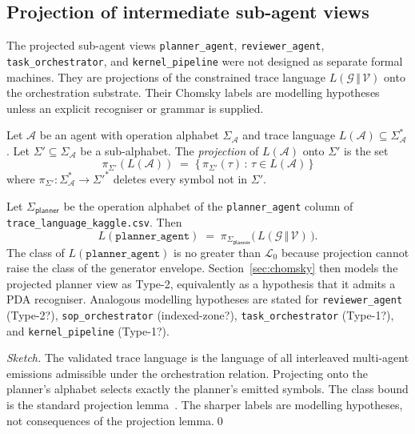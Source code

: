 \subsection{Projection of intermediate sub-agent views}

The projected sub-agent views \texttt{planner\_agent},
\texttt{reviewer\_agent}, \texttt{task\_orchestrator}, and
\texttt{kernel\_pipeline} were not designed as separate formal
machines.  They are projections of the constrained trace language
$L(\mathcal{G}\,\Vert\,\mathcal{V})$ onto the orchestration
substrate.  Their Chomsky labels are modelling hypotheses unless an
explicit recogniser or grammar is supplied.

\begin{definition}
\label{def:projection}
Let $\mathcal{A}$ be an agent with operation alphabet
$\Sigma_\mathcal{A}$ and trace language $L(\mathcal{A})\subseteq
\Sigma_\mathcal{A}^*$.  Let $\Sigma' \subseteq
\Sigma_\mathcal{A}$ be a sub-alphabet.  The \emph{projection}
of $L(\mathcal{A})$ onto $\Sigma'$ is the set
\[
\pi_{\Sigma'}(L(\mathcal{A})) \;=\;
\{\,\pi_{\Sigma'}(\tau) \,:\, \tau\in L(\mathcal{A})\,\}
\]
where $\pi_{\Sigma'}: \Sigma_\mathcal{A}^*\to{\Sigma'}^*$
deletes every symbol not in $\Sigma'$.
\end{definition}

\begin{theorem}
\label{thm:derived}
Let $\Sigma_{\textsf{planner}}$ be the operation alphabet of the
\texttt{planner\_agent} column of
\texttt{trace\_language\_kaggle.csv}.  Then
\[
L(\texttt{planner\_agent}) \;=\;
\pi_{\Sigma_{\textsf{planner}}}\bigl(\,L(\mathcal{G}\,\Vert\,\mathcal{V})\,
\bigr).
\]
The class of $L(\texttt{planner\_agent})$ is no greater than
$\mathcal{L}_0$ because projection cannot raise the class of the
generator envelope.  Section~\ref{sec:chomsky} then models the
projected planner view as Type-2, equivalently as a hypothesis that
it admits a PDA recogniser.  Analogous modelling hypotheses are
stated for \texttt{reviewer\_agent} (Type-2?),
\texttt{sop\_orchestrator} (indexed-zone?),
\texttt{task\_orchestrator} (Type-1?), and
\texttt{kernel\_pipeline} (Type-1?).
\end{theorem}

\begin{proof}[Sketch]
The validated trace language is the language of all interleaved
multi-agent emissions admissible under the orchestration
relation.  Projecting onto the planner's alphabet selects exactly
the planner's emitted symbols.  The class bound is the standard projection
lemma~\cite{hopcroft2006automata}.  The sharper labels are
modelling hypotheses, not consequences of the projection lemma.\qed
\end{proof}

